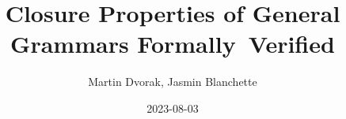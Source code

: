 \documentclass{beamer}
\title{Closure Properties of General Grammars Formally~Verified}
\author{Martin Dvorak, Jasmin Blanchette}
\date{2023-08-03}
\begin{document}
	
	\begin{frame}[plain]
		\maketitle
	\end{frame}
	
\end{document}
